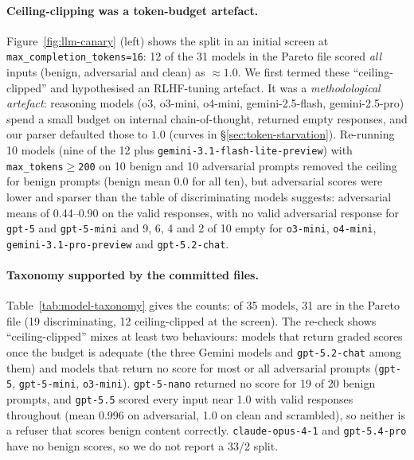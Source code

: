 \documentclass{article}
\begin{document}
\paragraph{Ceiling-clipping was a token-budget artefact.} Figure~\ref{fig:llm-canary} (left) shows the split in an initial screen at \texttt{max\_completion\_tokens=16}: 12 of the 31 models in the Pareto file scored \emph{all} inputs (benign, adversarial and clean) as $\approx 1.0$. We first termed these ``ceiling-clipped'' and hypothesised an RLHF-tuning artefact. It was a \emph{methodological artefact}: reasoning models (o3, o3-mini, o4-mini, gemini-2.5-flash, gemini-2.5-pro) spend a small budget on internal chain-of-thought, returned empty responses, and our parser defaulted those to $1.0$ (curves in \S\ref{sec:token-starvation}). Re-running 10 models (nine of the 12 plus \texttt{gemini-3.1-flash-lite-preview}) with \texttt{max\_tokens$\geq$200} on 10 benign and 10 adversarial prompts removed the ceiling for benign prompts (benign mean $0.0$ for all ten), but adversarial scores were lower and sparser than the table of discriminating models suggests: adversarial means of 0.44--0.90 on the valid responses, with no valid adversarial response for \texttt{gpt-5} and \texttt{gpt-5-mini} and 9, 6, 4 and 2 of 10 empty for \texttt{o3-mini}, \texttt{o4-mini}, \texttt{gemini-3.1-pro-preview} and \texttt{gpt-5.2-chat}.

\paragraph{Taxonomy supported by the committed files.} Table~\ref{tab:model-taxonomy} gives the counts: of 35 models, 31 are in the Pareto file (19 discriminating, 12 ceiling-clipped at the screen). The re-check shows ``ceiling-clipped'' mixes at least two behaviours: models that return graded scores once the budget is adequate (the three Gemini models and \texttt{gpt-5.2-chat} among them) and models that return no score for most or all adversarial prompts (\texttt{gpt-5}, \texttt{gpt-5-mini}, \texttt{o3-mini}). \texttt{gpt-5-nano} returned no score for 19 of 20 benign prompts, and \texttt{gpt-5.5} scored every input near 1.0 with valid responses throughout (mean 0.996 on adversarial, 1.0 on clean and scrambled), so neither is a refuser that scores benign content correctly. \texttt{claude-opus-4-1} and \texttt{gpt-5.4-pro} have no benign scores, so we do not report a 33/2 split.
\end{document}
